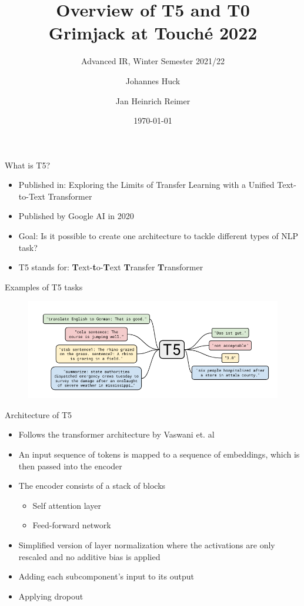 \documentclass[english]{mlutalk}
\title{Overview of T5 and T0\\Grimjack at Touché 2022}
\subtitle{Advanced IR, Winter Semester 2021/22}
\author{Johannes Huck \and Jan Heinrich Reimer}
\institute{Martin Luther University Halle-Wittenberg}
\date{\today}
\begin{document}
\titleframe

\begin{frame}{What is T5?~\cite{RaffelSRLNMZLL2020}}
  \begin{itemize}
    \item Published in: Exploring the Limits of Transfer Learning with a Unified
    Text-to-Text Transformer
    \item Published by Google AI in 2020
    \item Goal: Is it possible to create one architecture to tackle different types of NLP task? 
    \item T5 stands for: \textbf{T}ext-\textbf{t}o-\textbf{T}ext \textbf{T}ransfer \textbf{T}ransformer
  \end{itemize}
\end{frame}


\begin{frame}{Examples of T5 tasks}
  \begin{figure}
      \centering
      \includegraphics[width=\linewidth]{figures/t5-examples.png}
  \end{figure}
\end{frame}

\begin{frame}{Architecture of T5}
    \begin{itemize}
      \item Follows the transformer architecture by Vaswani et. al~\cite{VaswaniSPUJGKP2017}
      \item An input sequence of tokens is mapped to
      a sequence of embeddings, which is then passed into the encoder
      \item The encoder consists of a stack of blocks
      \begin{itemize}
        \item Self attention layer
        \item Feed-forward network
      \end{itemize}
      \item Simplified version of layer normalization where
      the activations are only rescaled and no additive bias is applied
      \item Adding each subcomponent’s input to its output
      \item Applying dropout
    \end{itemize}
\end{frame}
\end{document}
